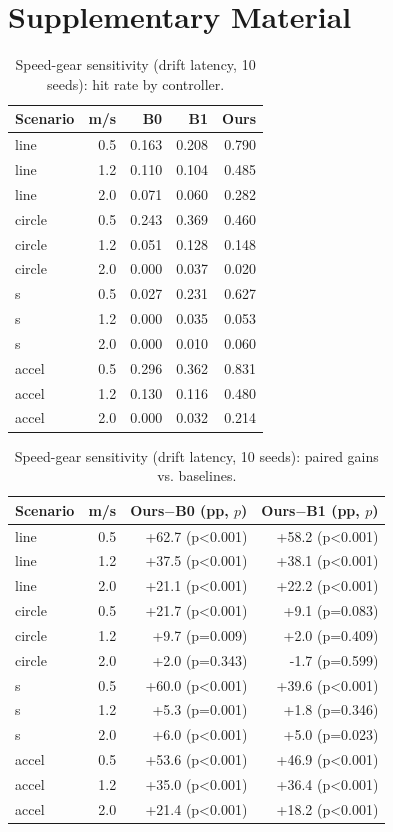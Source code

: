 \documentclass[journal]{IEEEtran}
\begin{document}
\section*{Supplementary Material}
\begin{table}[t]\centering\small
\caption{Speed-gear sensitivity (drift latency, 10 seeds): hit rate by controller.}\label{tab:speed_a}
\begin{tabular}{lrrrr}
\toprule Scenario & m/s & B0 & B1 & Ours\\ \midrule
line & 0.5 & 0.163 & 0.208 & 0.790\\
line & 1.2 & 0.110 & 0.104 & 0.485\\
line & 2.0 & 0.071 & 0.060 & 0.282\\
circle & 0.5 & 0.243 & 0.369 & 0.460\\
circle & 1.2 & 0.051 & 0.128 & 0.148\\
circle & 2.0 & 0.000 & 0.037 & 0.020\\
s & 0.5 & 0.027 & 0.231 & 0.627\\
s & 1.2 & 0.000 & 0.035 & 0.053\\
s & 2.0 & 0.000 & 0.010 & 0.060\\
accel & 0.5 & 0.296 & 0.362 & 0.831\\
accel & 1.2 & 0.130 & 0.116 & 0.480\\
accel & 2.0 & 0.000 & 0.032 & 0.214\\
\bottomrule\end{tabular}\end{table}
\begin{table}[t]\centering\small
\caption{Speed-gear sensitivity (drift latency, 10 seeds): paired gains vs. baselines.}\label{tab:speed_b}
\begin{tabular}{lrrr}
\toprule Scenario & m/s & Ours$-$B0 (pp, $p$) & Ours$-$B1 (pp, $p$)\\ \midrule
line & 0.5 & +62.7 (p<0.001) & +58.2 (p<0.001)\\
line & 1.2 & +37.5 (p<0.001) & +38.1 (p<0.001)\\
line & 2.0 & +21.1 (p<0.001) & +22.2 (p<0.001)\\
circle & 0.5 & +21.7 (p<0.001) & +9.1 (p=0.083)\\
circle & 1.2 & +9.7 (p=0.009) & +2.0 (p=0.409)\\
circle & 2.0 & +2.0 (p=0.343) & -1.7 (p=0.599)\\
s & 0.5 & +60.0 (p<0.001) & +39.6 (p<0.001)\\
s & 1.2 & +5.3 (p=0.001) & +1.8 (p=0.346)\\
s & 2.0 & +6.0 (p<0.001) & +5.0 (p=0.023)\\
accel & 0.5 & +53.6 (p<0.001) & +46.9 (p<0.001)\\
accel & 1.2 & +35.0 (p<0.001) & +36.4 (p<0.001)\\
accel & 2.0 & +21.4 (p<0.001) & +18.2 (p<0.001)\\
\bottomrule\end{tabular}\end{table}
\end{document}
